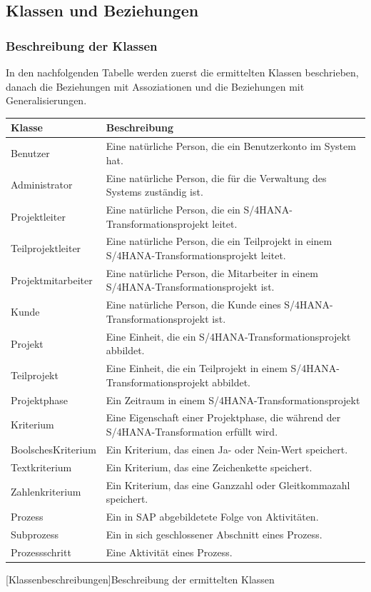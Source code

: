 \newpage
\subsection{Klassen und Beziehungen}
\subsubsection{Beschreibung der Klassen}
In den nachfolgenden Tabelle werden zuerst die ermittelten Klassen beschrieben, danach die Beziehungen mit Assoziationen und die Beziehungen mit Generalisierungen.

\begin{xltabular}{\textwidth}{|p{0.3\textwidth}|p{0.642\textwidth}|}
    \hline
    \textbf{Klasse} & \textbf{Beschreibung} \\\hline\hline
    Benutzer & Eine natürliche Person, die ein Benutzerkonto im System hat.\\\hline
    Administrator & Eine natürliche Person, die für die Verwaltung des Systems zuständig ist. \\\hline
    Projektleiter & Eine natürliche Person, die ein S/4HANA-Transformationsprojekt leitet. \\\hline
    Teilprojektleiter & Eine natürliche Person, die ein Teilprojekt in einem S/4HANA-Transformationsprojekt leitet. \\\hline
    Projektmitarbeiter & Eine natürliche Person, die Mitarbeiter in einem S/4HANA-Transformationsprojekt ist. \\\hline
    Kunde &  Eine natürliche Person, die Kunde eines S/4HANA-Transformationsprojekt ist.\\\hline
    Projekt & Eine Einheit, die ein S/4HANA-Transformationsprojekt abbildet. \\\hline
    Teilprojekt & Eine Einheit, die ein Teilprojekt in einem S/4HANA-Transformationsprojekt abbildet. \\\hline
    Projektphase & Ein Zeitraum in einem S/4HANA-Transformationsprojekt\\\hline
    Kriterium & Eine Eigenschaft einer Projektphase, die während der S/4HANA-Transformation erfüllt wird. \\\hline
    BoolschesKriterium & Ein Kriterium, das einen Ja- oder Nein-Wert speichert.\\\hline
    Textkriterium & Ein Kriterium, das eine Zeichenkette speichert.\\\hline
    Zahlenkriterium & Ein Kriterium, das eine Ganzzahl oder Gleitkommazahl speichert. \\\hline
    Prozess &  Ein in SAP abgebildetete Folge von Aktivitäten.\\\hline
    Subprozess &  Ein in sich geschlossener Abschnitt eines Prozess.\\\hline
    Prozessschritt & Eine Aktivität eines Prozess.\\\hline
\end{xltabular}
[Klassenbeschreibungen]{Beschreibung der ermittelten Klassen}

